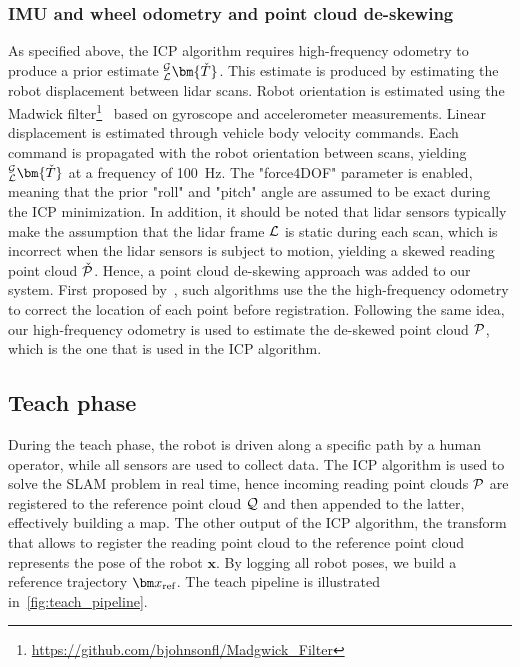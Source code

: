\subsubsection{\ac{IMU} and wheel odometry and point cloud de-skewing}
\label{sec:imu_wheel_odom}

As specified above, the \ac{ICP} algorithm requires high-frequency odometry to produce a prior estimate $_{\lidarf}^{\mapf}\bm{\check{T}}$.
This estimate is produced by estimating the robot displacement between lidar scans.
Robot orientation is estimated using the Madwick filter\footnote{\url{https://github.com/bjohnsonfl/Madgwick_Filter}}~\citep{Madgwick2011} based on gyroscope and accelerometer measurements.
Linear displacement is estimated through vehicle body velocity commands.
Each command is propagated with the robot orientation between scans, yielding $_{\lidarf}^{\mapf}\bm{\check{T}}$ at a frequency of \SI{100}{Hz}.
The "force4DOF" parameter is enabled, meaning that the prior "roll" and "pitch" angle are assumed to be exact during the \ac{ICP} minimization.
In addition, it should be noted that lidar sensors typically make the assumption that the lidar frame $\mathcal{L}$ is static during each scan, which is incorrect when the lidar sensors is subject to motion, yielding a skewed reading point cloud $\check{\mathcal{P}}$.
Hence, a point cloud de-skewing approach was added to our system.
First proposed by~\citet{Bosse2009}, such algorithms use the the high-frequency odometry to correct the location of each point before registration.
Following the same idea, our high-frequency odometry is used to estimate the de-skewed point cloud $\mathcal{P}$, which is the one that is used in the \ac{ICP} algorithm.


\subsection{Teach phase}
\label{sec:teach_phase}


During the teach phase, the robot is driven along a specific path by a human operator, while all sensors are used to collect data.
The \ac{ICP} algorithm is used to solve the \ac{SLAM} problem in real time, hence incoming reading point clouds $\mathcal{P}$ are registered to the reference point cloud $\mathcal{Q}$ and then appended to the latter, effectively building a map.
The other output of the \ac{ICP} algorithm, the transform that allows to register the reading point cloud to the reference point cloud \transform{\lidarf}{\mapf} represents the pose of the robot $\bm x$. %
By logging all robot poses, we build a reference trajectory $\reftraj$. %
The teach pipeline is illustrated in~\autoref{fig:teach_pipeline}.

